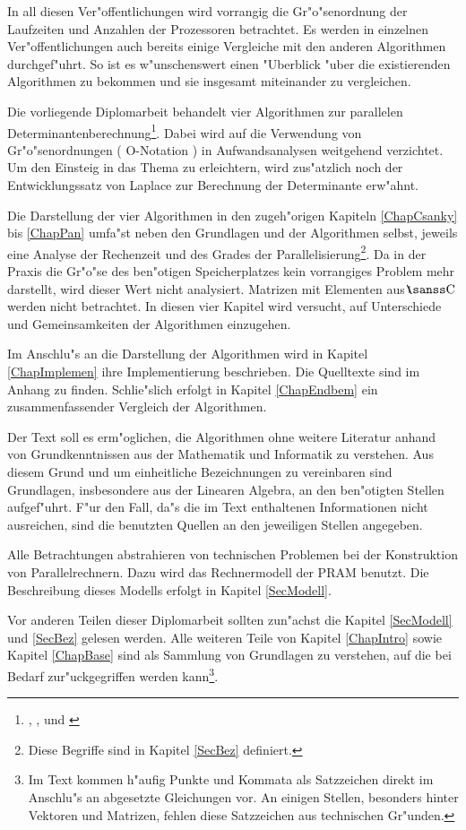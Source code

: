In all diesen Ver"offentlichungen wird vorrangig die Gr"o"senordnung 
der Laufzeiten und Anzahlen der Prozessoren betrachtet. Es werden in
einzelnen Ver"offentlichungen auch bereits einige Vergleiche mit den 
anderen Algorithmen durchgef"uhrt. So ist es w"unschenswert einen 
"Uberblick "uber die existierenden Algorithmen zu bekommen und sie 
insgesamt miteinander zu vergleichen.

Die vorliegende Diplomarbeit behandelt vier Algorithmen zur 
parallelen De\-ter\-mi\-nan\-ten\-be\-rech\-nung\footnote{ \cite{Csan76}, 
\cite{BGH82}, \cite{Berk84} und \cite{Pan85}}. Dabei wird auf die 
Verwendung von Gr"o"senordnungen ( O-Notation ) in Aufwandsanalysen 
weitgehend verzichtet.
Um den Einsteig in das Thema zu 
erleichtern, wird zus"atzlich noch der Entwicklungssatz von
Laplace zur Berechnung der Determinante erw"ahnt.

Die Darstellung der vier Algorithmen in den zugeh"origen Kapiteln
\ref{ChapCsanky} bis \ref{ChapPan} umfa"st neben den Grundlagen und der 
Algorithmen selbst, jeweils eine Analyse der Rechenzeit und des Grades der
Parallelisierung\footnote{Diese Begriffe sind in Kapitel \ref{SecBez}
definiert.}. Da in der Praxis die Gr"o"se des ben"otigen 
Speicherplatzes kein vorrangiges Problem mehr darstellt, wird dieser 
Wert nicht analysiert. Matrizen mit Elementen aus $\Complex$ werden nicht
betrachtet. In diesen vier Kapitel wird versucht, auf Unterschiede
und Gemeinsamkeiten der Algorithmen einzugehen.

Im Anschlu"s an die Darstellung der Algorithmen wird in Kapitel 
\ref{ChapImplemen} ihre Implementierung beschrieben. Die Quelltexte 
sind im Anhang zu finden.
Schlie"slich erfolgt in Kapitel \ref{ChapEndbem}
ein zusammenfassender Vergleich der Algorithmen.

Der Text soll es erm"oglichen, die Algorithmen ohne weitere Literatur 
anhand
von Grundkenntnissen aus der Mathematik und Informatik zu verstehen. 
Aus diesem Grund und um einheitliche Bezeichnungen zu vereinbaren sind 
Grundlagen, insbesondere aus der Linearen Algebra, an den ben"otigten 
Stellen aufgef"uhrt. F"ur den Fall, da"s die im Text enthaltenen
Informationen nicht ausreichen, sind die benutzten Quellen an den
jeweiligen Stellen angegeben.

Alle Betrachtungen abstrahieren von technischen Problemen bei der 
Konstruktion von Parallelrechnern. Dazu wird das Rechnermodell der
PRAM benutzt. Die Beschreibung dieses Modells erfolgt in 
Kapitel \ref{SecModell}. 

Vor anderen Teilen dieser Diplomarbeit sollten zun"achst die Kapitel 
\ref{SecModell} und \ref{SecBez} gelesen werden. Alle 
weiteren Teile von Kapitel \ref{ChapIntro} sowie Kapitel \ref{ChapBase}
sind als Sammlung von Grundlagen zu verstehen, auf die bei Bedarf 
zur"uckgegriffen werden kann\footnote{Im Text kommen h"aufig 
Punkte und Kommata als Satzzeichen direkt im Anschlu"s an
abgesetzte Gleichungen vor. An einigen Stellen, besonders hinter
Vektoren und Matrizen, fehlen diese Satzzeichen aus technischen 
Gr"unden.}.

